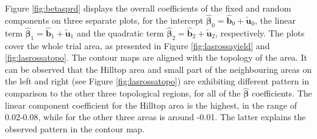 \documentclass[a4paper]{article}   	%
\begin{document}
	Figure \ref{fig:betasprd} displays the overall coefficients of the fixed and random components on three separate plots, for the intercept $\hat{\bm{\beta}}_0 = \hat{\bm{b}}_0+\tilde{\bm{u}}_0$, the linear term $\hat{\bm{\beta}}_1 = \hat{\bm{b}}_1+\tilde{\bm{u}}_1$ and the quadratic term $\hat{\bm{\beta}}_2 = \hat{\bm{b}}_2+\tilde{\bm{u}}_2$, respectively. The plots cover the whole trial area, as presented in Figure \ref{fig:lasrossayield} and \ref{fig:lasrossatopo}. 
	The contour maps are aligned with the topology of the area. It can be observed that the Hilltop area and small part of the neighbouring areas on the left and right (see Figure \ref{fig:lasrossatopo}) are exhibiting different pattern in comparison to the other three topological regions, for all of the $\hat{\bm{\beta}}$ coefficients. The linear component coefficient for the Hilltop area is the highest, in the range of 0.02-0.08, while for the other three areas is around -0.01. The latter explains the observed pattern in the contour map.
	
	
\end{document}
